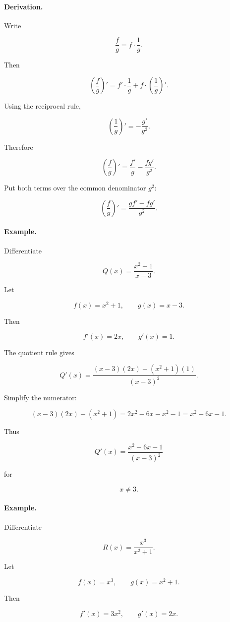 \paragraph{Derivation.}
Write

\[
\frac{f}{g}=f\cdot\frac1g.
\]

Then

\[
\left(\frac{f}{g}\right)'
=
f'\cdot\frac1g
+
f\cdot\left(\frac1g\right)'.
\]

Using the reciprocal rule,

\[
\left(\frac1g\right)'=-\frac{g'}{g^2}.
\]

Therefore

\[
\left(\frac{f}{g}\right)'
=
\frac{f'}{g}
-
\frac{fg'}{g^2}.
\]

Put both terms over the common denominator \(g^2\):

\[
\left(\frac{f}{g}\right)'
=
\frac{gf'-fg'}{g^2}.
\]

\paragraph{Example.}
Differentiate

\[
Q(x)=\frac{x^2+1}{x-3}.
\]

Let

\[
f(x)=x^2+1,
\qquad
g(x)=x-3.
\]

Then

\[
f'(x)=2x,
\qquad
g'(x)=1.
\]

The quotient rule gives

\[
Q'(x)
=
\frac{(x-3)(2x)-(x^2+1)(1)}{(x-3)^2}.
\]

Simplify the numerator:

\[
(x-3)(2x)-(x^2+1)
=
2x^2-6x-x^2-1
=
x^2-6x-1.
\]

Thus

\[
\boxed{
Q'(x)=\frac{x^2-6x-1}{(x-3)^2}
}
\]

for

\[
x\neq3.
\]

\paragraph{Example.}
Differentiate

\[
R(x)=\frac{x^3}{x^2+1}.
\]

Let

\[
f(x)=x^3,
\qquad
g(x)=x^2+1.
\]

Then

\[
f'(x)=3x^2,
\qquad
g'(x)=2x.
\]

